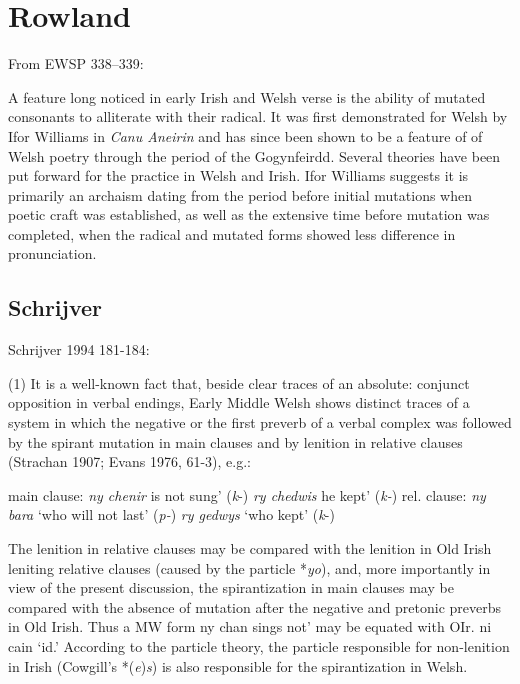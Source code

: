  \section{Rowland}
 
 From EWSP 338--339:
 
 A feature long noticed in early Irish and Welsh verse is the ability of mutated consonants to alliterate with their radical. It was first demonstrated for Welsh by Ifor Williams in \textit{Canu Aneirin} and has since been shown to be a feature of of Welsh poetry through the period of the Gogynfeirdd. Several theories have been put forward for the practice in Welsh and Irish. Ifor Williams suggests it is primarily an archaism dating from the period before initial mutations when poetic craft was established, as well as the extensive time before mutation was completed, when the radical and mutated forms showed less difference in pronunciation.
 
 \subsection{Schrijver}
Schrijver 1994 181-184: 

(1) It is a well-known fact that, beside clear traces of an absolute: conjunct opposition in verbal endings, Early Middle Welsh shows distinct traces of a system in which the negative or the first preverb of a verbal complex was followed by the spirant mutation in main clauses and by lenition in relative clauses (Strachan 1907; Evans 1976, 61-3), e.g.:

main clause: \textit{ny chenir} is not sung' (\textit{k}-)
\textit{ry chedwis} he kept' (\textit{k-})
rel. clause: \textit{ny bara} `who will not last' (\textit{p-})
\textit{ry gedwys} `who kept' (\textit{k}-)

The lenition in relative clauses may be compared with the lenition in Old Irish leniting relative clauses (caused by the particle *\textit{yo}), and, more importantly in view of the present discussion, the spirantization in main clauses may be compared with the absence of mutation after the negative and pretonic preverbs in Old Irish. Thus a MW form ny chan sings not' may be equated with OIr. ni cain `id.' According to the particle theory, the particle responsible for non-lenition in Irish (Cowgill's *(\textit{e})\textit{s}) is also responsible for the spirantization in Welsh.

